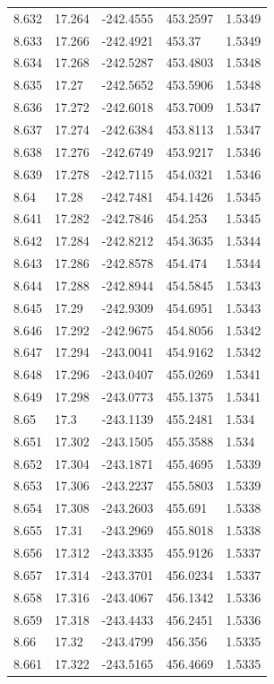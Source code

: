 \begin{tabular}{lllll}
8.632 & 17.264 & -242.4555 & 453.2597 & 1.5349 \\
8.633 & 17.266 & -242.4921 & 453.37 & 1.5349 \\
8.634 & 17.268 & -242.5287 & 453.4803 & 1.5348 \\
8.635 & 17.27 & -242.5652 & 453.5906 & 1.5348 \\
8.636 & 17.272 & -242.6018 & 453.7009 & 1.5347 \\
8.637 & 17.274 & -242.6384 & 453.8113 & 1.5347 \\
8.638 & 17.276 & -242.6749 & 453.9217 & 1.5346 \\
8.639 & 17.278 & -242.7115 & 454.0321 & 1.5346 \\
8.64 & 17.28 & -242.7481 & 454.1426 & 1.5345 \\
8.641 & 17.282 & -242.7846 & 454.253 & 1.5345 \\
8.642 & 17.284 & -242.8212 & 454.3635 & 1.5344 \\
8.643 & 17.286 & -242.8578 & 454.474 & 1.5344 \\
8.644 & 17.288 & -242.8944 & 454.5845 & 1.5343 \\
8.645 & 17.29 & -242.9309 & 454.6951 & 1.5343 \\
8.646 & 17.292 & -242.9675 & 454.8056 & 1.5342 \\
8.647 & 17.294 & -243.0041 & 454.9162 & 1.5342 \\
8.648 & 17.296 & -243.0407 & 455.0269 & 1.5341 \\
8.649 & 17.298 & -243.0773 & 455.1375 & 1.5341 \\
8.65 & 17.3 & -243.1139 & 455.2481 & 1.534 \\
8.651 & 17.302 & -243.1505 & 455.3588 & 1.534 \\
8.652 & 17.304 & -243.1871 & 455.4695 & 1.5339 \\
8.653 & 17.306 & -243.2237 & 455.5803 & 1.5339 \\
8.654 & 17.308 & -243.2603 & 455.691 & 1.5338 \\
8.655 & 17.31 & -243.2969 & 455.8018 & 1.5338 \\
8.656 & 17.312 & -243.3335 & 455.9126 & 1.5337 \\
8.657 & 17.314 & -243.3701 & 456.0234 & 1.5337 \\
8.658 & 17.316 & -243.4067 & 456.1342 & 1.5336 \\
8.659 & 17.318 & -243.4433 & 456.2451 & 1.5336 \\
8.66 & 17.32 & -243.4799 & 456.356 & 1.5335 \\
8.661 & 17.322 & -243.5165 & 456.4669 & 1.5335 \\

\end{tabular}
